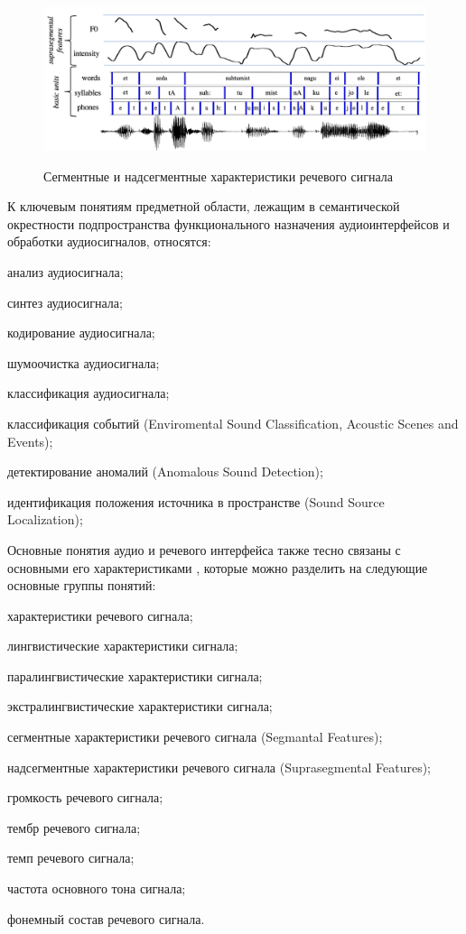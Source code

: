 \begin{figure}[H]
    \caption{Сегментные и надсегментные характеристики речевого сигнала \cite{Okko2022}}
        \includegraphics[scale=0.8, width=1.0\textwidth]{author/part4/figures/ch43_fig02_speech-structure-segment-suprasegment.png}
    \label{fig:speech-structure-segment-suprasegment}
\end{figure}

К ключевым понятиям предметной области, лежащим в семантической окрестности подпространства функционального назначения аудиоинтерфейсов и обработки аудиосигналов, относятся:
\begin{textitemize}    
    \item анализ аудиосигнала;
    \item синтез аудиосигнала;
    \item кодирование аудиосигнала;
    \item шумоочистка аудиосигнала;
    \item классификация аудиосигнала;
    \item классификация событий (Enviromental Sound Classification, Acoustic Scenes and Events);
    \item детектирование аномалий (Anomalous Sound Detection);
    \item идентификация положения источника в пространстве (Sound Source Localization);
\end{textitemize}

Основные понятия аудио и речевого интерфейса также тесно связаны с основными его характеристиками \textit{}, которые можно разделить на следующие основные группы понятий:
\begin{textitemize}
    \item характеристики речевого сигнала;
    \item лингвистические характеристики сигнала;
    \item паралингвистические характеристики сигнала;
    \item экстралингвистические характеристики сигнала;
    \item сегментные характеристики речевого сигнала (Segmantal Features);
    \item надсегментные характеристики речевого сигнала (Suprasegmental Features);
    \item громкость речевого сигнала;
    \item тембр речевого сигнала;
    \item темп речевого сигнала;
    \item частота основного тона сигнала;
    \item фонемный состав речевого сигнала.
\end{textitemize}


